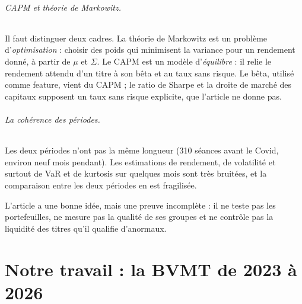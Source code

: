 \documentclass[11pt,a4paper]{article}
\begin{document}
\paragraph{CAPM et théorie de Markowitz.} Il faut distinguer deux cadres. La théorie de Markowitz est un problème d'\emph{optimisation} : choisir des poids qui minimisent la variance pour un rendement donné, à partir de $\mu$ et $\Sigma$. Le CAPM est un modèle d'\emph{équilibre} : il relie le rendement attendu d'un titre à son bêta et au taux sans risque. Le bêta, utilisé comme feature, vient du CAPM ; le ratio de Sharpe et la droite de marché des capitaux supposent un taux sans risque explicite, que l'article ne donne pas.

\paragraph{La cohérence des périodes.} Les deux périodes n'ont pas la même longueur (310 séances avant le Covid, environ neuf mois pendant). Les estimations de rendement, de volatilité et surtout de VaR et de kurtosis sur quelques mois sont très bruitées, et la comparaison entre les deux périodes en est fragilisée.

\begin{retenir}
L'article a une bonne idée, mais une preuve incomplète : il ne teste pas les portefeuilles, ne mesure pas la qualité de ses groupes et ne contrôle pas la liquidité des titres qu'il qualifie d'anormaux.
\end{retenir}

\part{Notre travail : la BVMT de 2023 à 2026}
\end{document}
